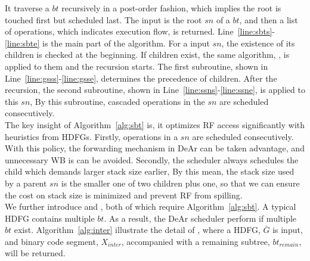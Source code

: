 It traverse a $bt$ recursively in a post-order fashion, which implies the root is touched first but scheduled last.
The input is the root $sn$ of a $bt$, and then a list of operations, which indicates execution flow, is returned.
Line~\ref{line:sbts}-\ref{line:sbte} is the main part of the algorithm.
For a input $sn$, the existence of its children is checked at the beginning.
If children exist, the same algorithm, , is applied to them and the recursion starts.
The first subroutine,  shown in Line~\ref{line:gsss}-\ref{line:gsse}, determines the precedence of children.
After the recursion, the second subroutine, 
 shown in Line~\ref{line:ssns}-\ref{line:ssne}, is applied to this $sn$, 
By this subroutine, cascaded operations in the $sn$ are scheduled consecutively.
\\\indent
The key insight of Algorithm~\ref{alg:sbt} is, it optimizes RF access significantly with heuristics from HDFGs.
Firstly, operations in a $sn$ are scheduled consecutively.
With this policy, the forwarding mechanism in DeAr can be taken advantage, and unnecessary WB is can be avoided.
Secondly, the scheduler always schedules the child which demands larger stack size earlier, 
By this mean, the stack size used by a parent $sn$ is the smaller one of two children plus one, 
so that we can ensure the cost on stack size is minimized and prevent RF from spilling.
\\\indent
We further introduce  and , 
both of which require Algorithm~\ref{alg:sbt}.
A typical HDFG contains multiple $bt$.
As a result, the DeAr scheduler perform  if multiple $bt$ exist.
Algorithm~\ref{alg:inter} illustrate the detail of , 
where a HDFG, $\bar{G}$ is input, and binary code segment, 
$X_{inter}$, accompanied with a remaining subtree, $bt_{remain}$, will be returned.

